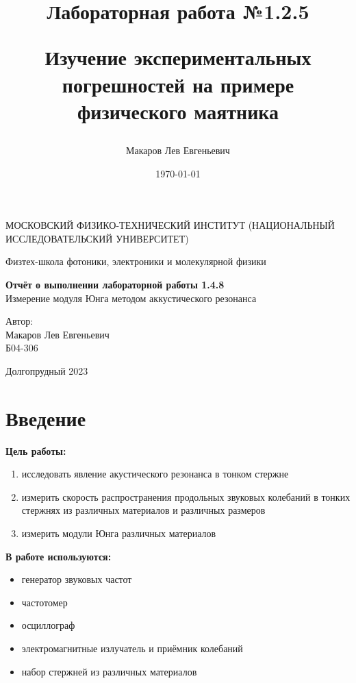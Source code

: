 \documentclass[a4paper,12pt]{article}
\author{Макаров Лев Евгеньевич}
\title{Лабораторная работа №1.2.5

Изучение экспериментальных погрешностей на примере физического маятника
}
\date{\today}
\begin{document}
\begin{titlepage}
	\begin{center}
		{\large МОСКОВСКИЙ ФИЗИКО-ТЕХНИЧЕСКИЙ ИНСТИТУТ (НАЦИОНАЛЬНЫЙ ИССЛЕДОВАТЕЛЬСКИЙ УНИВЕРСИТЕТ)}
	\end{center}
	\begin{center}
		{\large Физтех-школа фотоники, электроники и молекулярной физики}
	\end{center}
	
	
	\vspace{4.5cm}
	{\huge
		\begin{center}
			{\bf Отчёт о выполнении лабораторной работы 1.4.8}\\
			Измерение модуля Юнга методом аккустического резонанса
		\end{center}
	}
	\vspace{2cm}
	\begin{flushright}
		{\LARGE Автор:\\ Макаров Лев Евгеньевич \\
			\vspace{0.2cm}
			Б04-306}
	\end{flushright}
	\vspace{8cm}
	\begin{center}
		Долгопрудный 2023
	\end{center}
\end{titlepage}

\section{Введение}

\textbf{Цель работы:} 
\begin{enumerate}
	\item исследовать явление акустического резонанса в тонком стержне
	\item измерить скорость распространения продольных звуковых колебаний в тонких стержнях из различных материалов и различных размеров
    \item измерить модули Юнга различных материалов
\end{enumerate}

\textbf{В работе используются:} 
\begin{itemize}
    \item генератор звуковых частот
    \item частотомер
    \item осциллограф
    \item электромагнитные излучатель и приёмник колебаний
    \item набор стержней из различных материалов
\end{itemize}
\medskip
\end{document}
